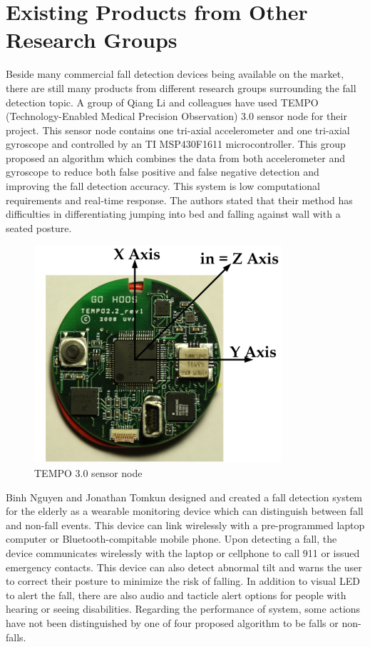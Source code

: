 \documentclass[letterpaper,12pt,titlepage,oneside,final]{book}
\begin{document}
\section{Existing Products from Other Research Groups}
Beside many commercial fall detection devices being available on the market, there are still many products from different research groups surrounding the fall detection topic. A group of Qiang Li and colleagues have used TEMPO (Technology-Enabled Medical Precision Observation) 3.0 sensor node for their project. This sensor node contains one tri-axial accelerometer and one tri-axial gyroscope and controlled by an TI MSP430F1611 microcontroller. This group proposed an algorithm which combines the data from both accelerometer and gyroscope to reduce both false positive and false negative detection and improving the fall detection accuracy. This system is low computational requirements and real-time response. The authors stated that their method has difficulties in differentiating jumping into bed and falling against wall with a seated posture. 

 \begin{figure}[h!]
	\centering
	\includegraphics{tempo}
	\caption{TEMPO 3.0 sensor node}
\end{figure}

Binh Nguyen and Jonathan Tomkun designed and created a fall detection system for the elderly as a wearable monitoring device which can distinguish between fall and non-fall events. This device can link wirelessly with a pre-programmed laptop computer or Bluetooth-compitable mobile phone. Upon detecting a fall, the device communicates wirelessly with the laptop or cellphone to call 911 or issued emergency contacts. This device can also detect abnormal tilt and warns the user to correct their posture to minimize the risk of falling. In addition to visual LED to alert the fall, there are also audio and tacticle alert options for people with hearing or seeing disabilities. Regarding the performance of system, some actions have not been distinguished by one of four proposed algorithm to be falls or non-falls. 
\end{document}

